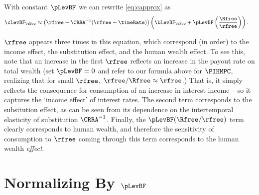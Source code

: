 With constant $\pLevBF$ we can rewrite \eqref{eq:capprox} as
\begin{equation}\begin{gathered}\begin{aligned}
        \cLevBF_{\tNow} & \approx  \left(\rfree-\CRRA^{-1}(\rfree-\timeRate)\right)\left(\bLevBF_{\tNow}+ \pLevBF\left(\frac{\Rfree}{\rfree}\right)\right).
\end{aligned}\end{gathered}\end{equation}

$\rfree$ appears three times in this equation, which correspond (in
order) to the income effect, the substitution effect, and the human
wealth effect.  To see this, note that an increase in the first
$\rfree$ reflects an increase in the payout rate on total wealth (set
$\pLevBF = 0$ and refer to our formula above for $\PIHMPC$, realizing
that for small $\rfree$, $\rfree/\Rfree \approx \rfree$.)  That is, it
simply reflects the consequence for consumption of an increase in interest
income -- so it captures the `income effect' of interest rates.  The second term
corresponds to the subsitution effect, as can be seen from its
dependence on the intertemporal elasticity of substitution
$\CRRA^{-1}$.  Finally, the $\pLevBF(\Rfree/\rfree)$ term clearly
corresponds to human wealth, and therefore the sensitivity of
consumption to $\rfree$ coming through this term corresponds to the
human wealth {\it effect}.  



\section{Normalizing By $\pLevBF$}

